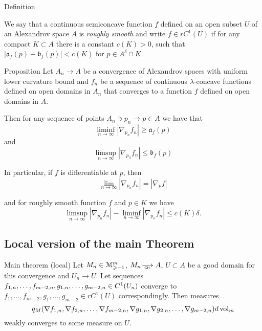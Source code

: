 \begin{thm}{Definition}

We say that a continuous semiconcave function $f$  defined
on an open subset $U$ of an Alexandrov space $A$
is \emph { roughly smooth}
and write $f\in rC^1(U)$
if 
for any compact $K\subset A$ there
is a constant $c(K)>0$, such that
$|\mathfrak{a}_f(p)-\mathfrak{b}_f(p)|< c(K)   $
for $p\in A^\delta\cap K$.
\end{thm}

\begin{thm}{Proposition}\label{prop:ab}
Let $A_n\to A$ be a convergence of Alexandrov spaces with uniform lower curvature bound
and $f_n$ be a sequence of continuous $\lambda$-concave functions defined on open domains in  $A_n$ that converges to a function $f$ defined on open domains in  $A$.

Then for any sequence of points $A_n\ni p_n\to p\in A$ we have
that 
\[\liminf_{n\to\infty}|\nabla_{p_n}f_n|\ge \mathfrak{a}_{f}(p)\]
and 
\[\limsup_{n\to\infty}|\nabla_{p_n}f_n|\le \mathfrak{b}_{f}(p)\]

In particular, if $f$ is differentiable at $p$, then 
\[\lim_{n\to\infty}|\nabla_{p_n}f_n|= |\nabla_{p}f|\]


and for   roughly smooth function $f$
and $p\in K$ we have
\[
\limsup_{n\to\infty}|\nabla_{p_n}f_n|-
\liminf_{n\to\infty}|\nabla_{p_n}f_n|
\le c(K)\delta. \]
 

\end{thm}






 
 
 
 \subsection{Local version of the main Theorem }\label{sec:loc}
 
 
\begin{thm}{Main theorem (local)}\label{mainloc}
Let   
$M_n\in\mathcal M_{\geqslant -1}^m$,
$M_n\GHto A$, 
  $U\subset A$ be a good domain for this convergence
  and $U_n\to U$.
  Let sequences $f_{1,n},\dots,f_{m-2,n},\\ g_{1,n},\dots,g_{m-2,n}\in C^1(U_n)$ 
 converge to
   $f_1,\dots, f_{m-2}, g_1,\dots, g_{m-2}\in rC^1(U)$ correspondingly.
Then measures 
$${q}_M(\nabla f_{1,n},\nabla f_{2,n},\dots,\nabla f_{m-2,n},
\nabla g_{1,n},\nabla g_{2,n},\dots,\nabla g_{m-2,n})d\operatorname{vol}_m$$ weakly converges to some
measure on $U$.
\end{thm}

